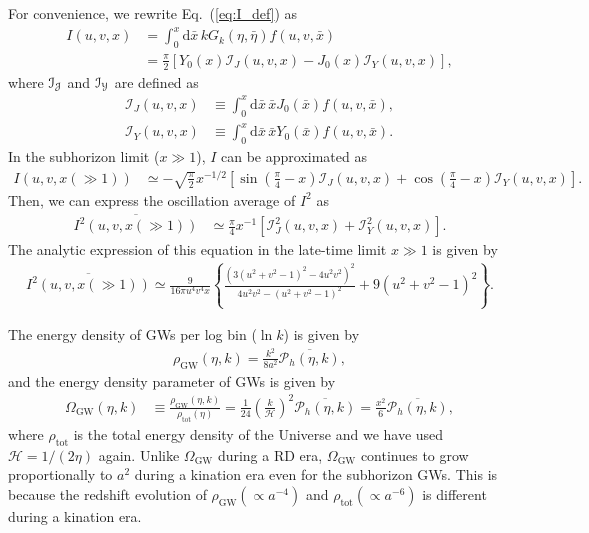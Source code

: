 \documentclass[superscriptaddress, aps, preprintnumbers,
amsmath, amssymb, sort&compress, nofootinbib, 10pt, paper, floatfix]{revtex4-2}
\newcommand{\dd}{\mathrm{d}}
\newcommand{\GW}{\text{GW}}
\newcommand{\tot}{\text{tot}}
\begin{document}
For convenience, we rewrite Eq.~(\ref{eq:I_def}) as 
\begin{align}
         I(u,v,x) &= \int^x_0 \dd \bar x\, k G_k(\eta, \bar \eta) f(u,v,\bar x) \nonumber \\
         & = \frac{\pi}{2} \left[ Y_0(x) \mathcal I_{J}(u,v,x) -  J_0(x) \mathcal I_{Y}(u,v,x) \right],
         \label{eq:i_kernel}
\end{align}
where $\cal I_J$ and $\cal I_Y$ are defined as 
\begin{align}
       \label{eq:calI_J}
       \mathcal I_{J}(u,v,x) &\equiv  \int^x_{0} \dd \bar x \, \bar x J_0(\bar x) f(u,v,\bar x), \\ 
       \mathcal I_{Y}(u,v,x) &\equiv  \int^x_{0} \dd \bar x \, \bar x Y_0(\bar x) f(u,v,\bar x).
       \label{eq:calI_Y}
\end{align}
In the subhorizon limit ($x \gg 1$), $I$ can be approximated as 
\begin{align}
        I(u,v,x(\gg 1))
         & \simeq -\sqrt{\frac{\pi}{2}} x^{-1/2} \left[ \sin\left( \frac{\pi}{4} - x \right) \mathcal I_{J}(u,v,x) + \cos\left( \frac{\pi}{4} - x \right) \mathcal I_{Y}(u,v,x) \right].
\end{align}
Then, we can express the oscillation average of $I^2$ as 
\begin{align}
       \overline{I^2(u,v,x(\gg 1))}
         & \simeq \frac{\pi}{4} x^{-1} \left[ \mathcal I_{J}^2(u,v,x) + \mathcal I_{Y}^2(u,v,x) \right].
\end{align}
The analytic expression of this equation in the late-time limit $x\gg 1$ is given by~\cite{Domenech:2019quo}
\begin{align}
  \overline{I^2(u,v,x(\gg 1))} \simeq \frac{9}{16 \pi u^4 v^4 x} \left\{ \frac{(3(u^2 + v^2 -1)^2 - 4 u^2 v^2)^2}{4 u^2 v^2 - (u^2 + v^2-1)^2} + 9(u^2 + v^2-1)^2 \right\}.
\end{align}


The energy density of GWs per log bin ($\ln k$) is given by
\begin{align}
  \rho_\GW(\eta,k) = \frac{k^2}{8a^2}\overline{\mathcal P_h(\eta,k)},
\end{align}
and the energy density parameter of GWs is given by 
\begin{align}
        \Omega_\GW(\eta,k) &\equiv \frac{\rho_\GW(\eta,k)}{\rho_\tot(\eta)}= \frac{1}{24} \left( \frac{k}{\mathcal H}\right)^2 \overline{\mathcal P_h(\eta,k)} = \frac{x^2}{6} \overline{\mathcal P_h(\eta,k)}, 
\end{align}
where $\rho_\tot$ is the total energy density of the Universe and we have used $\mathcal H = 1/(2 \eta)$ again.
Unlike $\Omega_\GW$ during a RD era, $\Omega_\GW$ continues to grow proportionally to $a^2$ during a kination era even for the subhorizon GWs. 
This is because the redshift evolution of $\rho_\GW (\propto a^{-4})$ and $\rho_\tot (\propto a^{-6})$ is different during a kination era.
\end{document}
